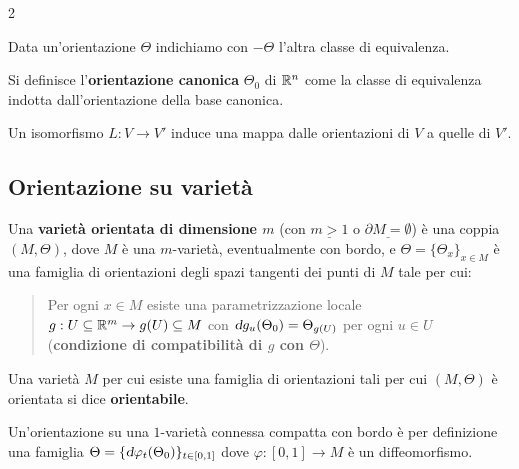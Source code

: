 \begin{multicols*}{2}
\begin{definition}[Orientazione]
        Data un'orientazione $\Theta$ indichiamo con $-\Theta$ l'altra
        classe di equivalenza.
    \end{definition}

    \begin{definition}
        Si definisce l'\textbf{orientazione canonica} $\Theta_0$ di $\mathbb{R}^n$
        come la classe di equivalenza indotta dall'orientazione della base
        canonica.
    \end{definition}

    \begin{remark}
        Un isomorfismo $L : V \to V'$ induce una mappa dalle orientazioni
        di $V$ a quelle di $V'$.
    \end{remark}

    \subsection{Orientazione su varietà}

    \begin{definition}[$m$-varietà orientata, $m > 1$ o $\partial M = \emptyset$]
        Una \textbf{varietà orientata di dimensione $m$} (con $\underline{m>1}$ o $\underline{\partial M = \emptyset}$)
        è una coppia $(M, \Theta)$, dove $M$ è una $m$-varietà, eventualmente con bordo, e $\Theta = \{\Theta_x\}_{x \in M}$
        è una famiglia di orientazioni degli spazi tangenti dei punti di $M$ tale per cui:

        \begin{quote}
            Per ogni $x \in M$ esiste una parametrizzazione locale $g : U \subseteq \mathbb{R}^m \to g(U) \subseteq M$ con
            $\dif g_u (\Theta_0) = \Theta_{g(U)}$ per ogni $u \in U$ (\textbf{condizione di compatibilità di $g$ con $\Theta$}).
        \end{quote}

        Una varietà $M$ per cui esiste una famiglia di orientazioni tali per cui $(M, \Theta)$ è orientata si
        dice \textbf{orientabile}.
    \end{definition}

    \begin{definition}
        Un'orientazione su una $1$-varietà connessa compatta con bordo è per definizione una famiglia
        $\Theta = \{\dif \varphi_t(\Theta_0)\}_{t \in [0, 1]}$ dove
        $\varphi : [0, 1] \to M$ è un diffeomorfismo. \smallskip


\end{definition}
\end{multicols*}

